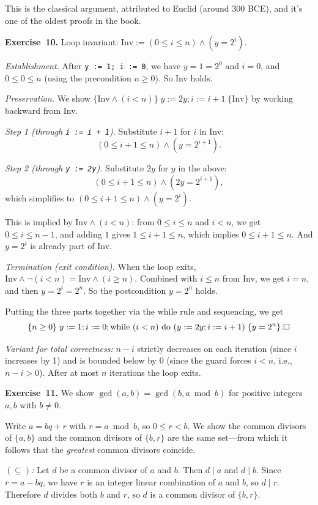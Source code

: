 \documentclass[11pt]{article}
\begin{document}
This is the classical argument, attributed to Euclid (around 300 BCE), and it's one of the oldest proofs in the book.

\medskip
\textbf{Exercise~10.}
Loop invariant: $\text{Inv} := (0 \leq i \leq n) \wedge (y = 2^i)$.

\emph{Establishment.} After \texttt{y := 1; i := 0}, we have $y = 1 = 2^0$ and $i = 0$, and $0 \leq 0 \leq n$ (using the precondition $n \geq 0$). So Inv holds.

\emph{Preservation.} We show $\{\text{Inv} \wedge (i < n)\}\; y := 2y; i := i + 1\; \{\text{Inv}\}$ by working backward from Inv.

\emph{Step 1 (through \texttt{i := i + 1}).} Substitute $i + 1$ for $i$ in Inv:
\[
  (0 \leq i + 1 \leq n) \wedge (y = 2^{i+1}).
\]

\emph{Step 2 (through \texttt{y := 2y}).} Substitute $2y$ for $y$ in the above:
\[
  (0 \leq i + 1 \leq n) \wedge (2y = 2^{i+1}),
\]
which simplifies to $(0 \leq i + 1 \leq n) \wedge (y = 2^i)$.

This is implied by $\text{Inv} \wedge (i < n)$: from $0 \leq i \leq n$ and $i < n$, we get $0 \leq i \leq n - 1$, and adding $1$ gives $1 \leq i + 1 \leq n$, which implies $0 \leq i + 1 \leq n$. And $y = 2^i$ is already part of Inv. \checkmark

\emph{Termination (exit condition).} When the loop exits, $\text{Inv} \wedge \lnot(i < n) = \text{Inv} \wedge (i \geq n)$. Combined with $i \leq n$ from Inv, we get $i = n$, and then $y = 2^i = 2^n$. So the postcondition $y = 2^n$ holds.

Putting the three parts together via the while rule and sequencing, we get
\[
  \{n \geq 0\}\; y := 1; i := 0; \text{while }(i < n)\text{ do }(y := 2y; i := i + 1)\;\{y = 2^n\}. \hfill\square
\]

\emph{Variant for total correctness:} $n - i$ strictly decreases on each iteration (since $i$ increases by 1) and is bounded below by $0$ (since the guard forces $i < n$, i.e., $n - i > 0$). After at most $n$ iterations the loop exits.

\medskip
\textbf{Exercise~11.}
We show $\gcd(a, b) = \gcd(b, a \bmod b)$ for positive integers $a, b$ with $b \neq 0$.

Write $a = bq + r$ with $r = a \bmod b$, so $0 \leq r < b$. We show the common divisors of $\{a, b\}$ and the common divisors of $\{b, r\}$ are the same set---from which it follows that the \emph{greatest} common divisors coincide.

\emph{$(\subseteq)$:} Let $d$ be a common divisor of $a$ and $b$. Then $d \mid a$ and $d \mid b$. Since $r = a - bq$, we have $r$ is an integer linear combination of $a$ and $b$, so $d \mid r$. Therefore $d$ divides both $b$ and $r$, so $d$ is a common divisor of $\{b, r\}$.
\end{document}
